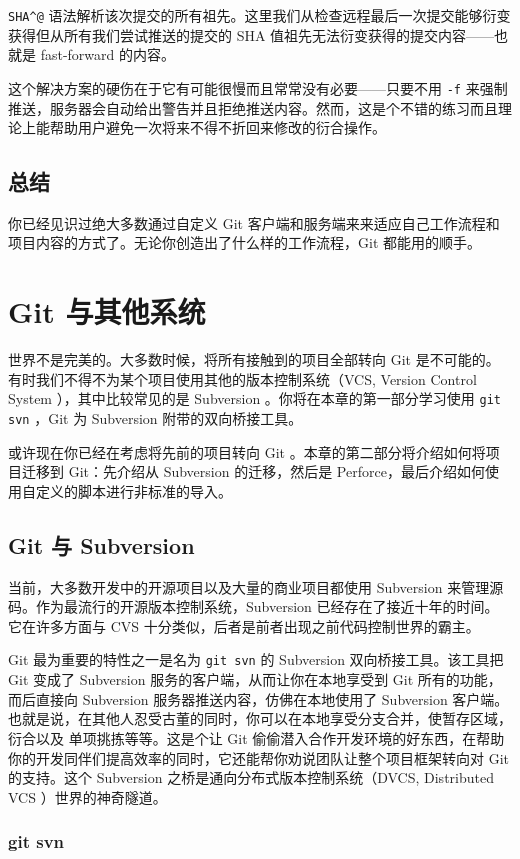 \documentclass[a4paper]{book}
\newcommand{\chap}[1]{\newpage\thispagestyle{empty}\chapter{#1}\label{chap:\thechapter}}
\begin{document}
\texttt{SHA\^{}@} 语法解析该次提交的所有祖先。这里我们从检查远程最后一次提交能够衍变获得但从所有我们尝试推送的提交的 SHA 值祖先无法衍变获得的提交内容------也就是 fast-forward 的内容。

这个解决方案的硬伤在于它有可能很慢而且常常没有必要------只要不用 \texttt{-f} 来强制推送，服务器会自动给出警告并且拒绝推送内容。然而，这是个不错的练习而且理论上能帮助用户避免一次将来不得不折回来修改的衍合操作。

\section{总结}

你已经见识过绝大多数通过自定义 Git 客户端和服务端来来适应自己工作流程和项目内容的方式了。无论你创造出了什么样的工作流程，Git 都能用的顺手。

\chap{Git 与其他系统}

世界不是完美的。大多数时候，将所有接触到的项目全部转向 Git 是不可能的。有时我们不得不为某个项目使用其他的版本控制系统（VCS, Version Control System ），其中比较常见的是 Subversion 。你将在本章的第一部分学习使用 \texttt{git svn} ，Git 为 Subversion 附带的双向桥接工具。

或许现在你已经在考虑将先前的项目转向 Git 。本章的第二部分将介绍如何将项目迁移到 Git：先介绍从 Subversion 的迁移，然后是 Perforce，最后介绍如何使用自定义的脚本进行非标准的导入。

\section{Git 与 Subversion}

当前，大多数开发中的开源项目以及大量的商业项目都使用 Subversion 来管理源码。作为最流行的开源版本控制系统，Subversion 已经存在了接近十年的时间。它在许多方面与 CVS 十分类似，后者是前者出现之前代码控制世界的霸主。

Git 最为重要的特性之一是名为 \texttt{git svn} 的 Subversion 双向桥接工具。该工具把 Git 变成了 Subversion 服务的客户端，从而让你在本地享受到 Git 所有的功能，而后直接向 Subversion 服务器推送内容，仿佛在本地使用了 Subversion 客户端。也就是说，在其他人忍受古董的同时，你可以在本地享受分支合并，使暂存区域，衍合以及 单项挑拣等等。这是个让 Git 偷偷潜入合作开发环境的好东西，在帮助你的开发同伴们提高效率的同时，它还能帮你劝说团队让整个项目框架转向对 Git 的支持。这个 Subversion 之桥是通向分布式版本控制系统（DVCS, Distributed VCS ）世界的神奇隧道。

\subsection{git svn}
\end{document}

